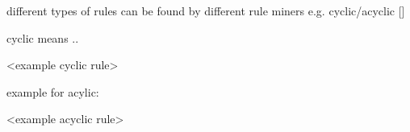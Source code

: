 different types of rules can be found by different rule miners
e.g. cyclic/acyclic []

cyclic means ..

<example cyclic rule>

example for acylic:

<example acyclic rule>
